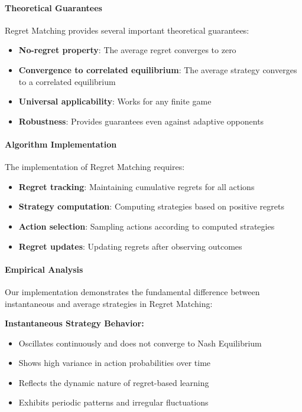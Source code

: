 \documentclass[conference]{IEEEtran}
\begin{document}
\paragraph{Theoretical Guarantees}

Regret Matching provides several important theoretical guarantees:

\begin{itemize}
    \item \textbf{No-regret property}: The average regret converges to zero
    \item \textbf{Convergence to correlated equilibrium}: The average strategy converges to a correlated equilibrium
    \item \textbf{Universal applicability}: Works for any finite game
    \item \textbf{Robustness}: Provides guarantees even against adaptive opponents
\end{itemize}

\paragraph{Algorithm Implementation}

The implementation of Regret Matching requires:

\begin{itemize}
    \item \textbf{Regret tracking}: Maintaining cumulative regrets for all actions
    \item \textbf{Strategy computation}: Computing strategies based on positive regrets
    \item \textbf{Action selection}: Sampling actions according to computed strategies
    \item \textbf{Regret updates}: Updating regrets after observing outcomes
\end{itemize}

\paragraph{Empirical Analysis}

Our implementation demonstrates the fundamental difference between instantaneous and average strategies in Regret Matching:

\textbf{Instantaneous Strategy Behavior:}
\begin{itemize}
    \item Oscillates continuously and does not converge to Nash Equilibrium
    \item Shows high variance in action probabilities over time
    \item Reflects the dynamic nature of regret-based learning
    \item Exhibits periodic patterns and irregular fluctuations
\end{itemize}
\end{document}
